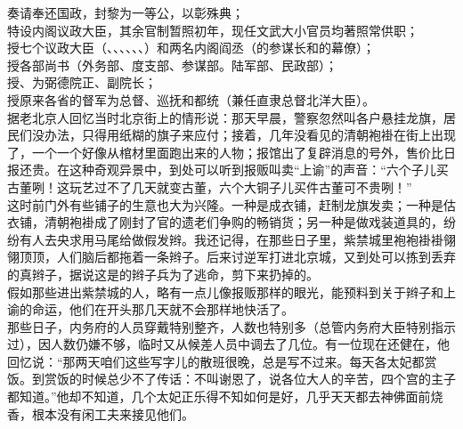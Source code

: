 奏请奉还国政，封黎为一等公，以彰殊典；\\

特设内阁议政大臣，其余官制暂照初年，现任文武大小官员均著照常供职；\\

授七个议政大臣（、、、、、、）和两名内阁阎丞（的参谋长和的幕僚）；\\

授各部尚书（外务部、度支部、参谋部。陆军部、民政部）；\\

授、为弼德院正、副院长；\\

授原来各省的督军为总督、巡抚和都统（兼任直隶总督北洋大臣）。\\

据老北京人回忆当时北京街上的情形说：那天早晨，警察忽然叫各户悬挂龙旗，居民们没办法，只得用纸糊的旗子来应付；接着，几年没看见的清朝袍褂在街上出现了，一个一个好像从棺材里面跑出来的人物；报馆出了复辟消息的号外，售价比日报还贵。在这种奇观异景中，到处可以听到报贩叫卖“上谕”的声音：“六个子儿买古董咧！这玩艺过不了几天就变古董，六个大铜子儿买件古董可不贵咧！”\\

这时前门外有些铺子的生意也大为兴隆。一种是成衣铺，赶制龙旗发卖；一种是估衣铺，清朝袍褂成了刚封了官的遗老们争购的畅销货；另一种是做戏装道具的，纷纷有人去央求用马尾给做假发辫。我还记得，在那些日子里，紫禁城里袍袍褂褂翎翎顶顶，人们脑后都拖着一条辫子。后来讨逆军打进北京城，又到处可以拣到丢弃的真辫子，据说这是的辫子兵为了逃命，剪下来扔掉的。\\

假如那些进出紫禁城的人，略有一点儿像报贩那样的眼光，能预料到关于辫子和上谕的命运，他们在开头那几天就不会那样地快活了。\\

那些日子，内务府的人员穿戴特别整齐，人数也特别多（总管内务府大臣特别指示过），因人数仍嫌不够，临时又从候差人员中调去了几位。有一位现在还健在，他回忆说：“那两天咱们这些写字儿的散班很晚，总是写不过来。每天各太妃都赏饭。到赏饭的时候总少不了传话：不叫谢恩了，说各位大人的辛苦，四个宫的主子都知道。”他却不知道，几个太妃正乐得不知如何是好，几乎天天都去神佛面前烧香，根本没有闲工夫来接见他们。\\

